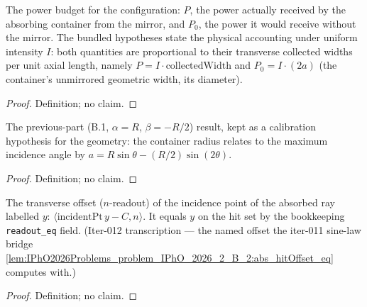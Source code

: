 \begin{definition}
\label{def:IPhO2026Problems_problem_IPhO_2026_2_B_2:PowerBudget}
The power budget for the configuration: $P$, the power actually received by
the absorbing container from the mirror, and $P_0$, the power it would
receive without the mirror.  The bundled hypotheses state the physical
accounting under uniform intensity $I$: both quantities are proportional to
their transverse collected widths per unit axial length, namely
$P = I \cdot \mathrm{collectedWidth}$ and $P_0 = I \cdot (2a)$ (the
container's unmirrored geometric width, its diameter).
\end{definition}
\begin{proof}
Definition; no claim.
\end{proof}

\begin{definition}[B.1 calibration]
\label{def:IPhO2026Problems_problem_IPhO_2026_2_B_2:B1Calibration}
The previous-part (B.1, $\alpha = R$, $\beta = -R/2$) result, kept as a
calibration hypothesis for the geometry: the container radius relates to
the maximum incidence angle by
$a = R \sin\theta - (R/2) \sin(2\theta)$.
\end{definition}
\begin{proof}
Definition; no claim.
\end{proof}

\begin{definition}
\label{def:IPhO2026Problems_problem_IPhO_2026_2_B_2:hitOffset}
The transverse offset ($n$-readout) of the incidence point of the
absorbed ray labelled $y$: $\langle \mathrm{incidentPt}\,y - C,
n\rangle$.  It equals $y$ on the hit set by the bookkeeping
\texttt{readout\_eq} field.  (Iter-012 transcription --- the named
offset the iter-011 sine-law bridge
\cref{lem:IPhO2026Problems_problem_IPhO_2026_2_B_2:abs_hitOffset_eq}
computes with.)
\end{definition}
\begin{proof}
Definition; no claim.
\end{proof}

